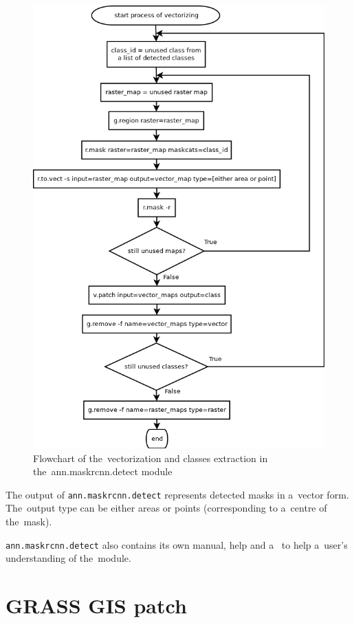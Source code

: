 \begin{figure}[H]
   \centering
	\includegraphics[width=0.95\linewidth]{./pictures/vectorize.png}
	\caption[vectorization in ann.maskrcnn.detect flowchart]{Flowchart of the~vectorization and classes extraction in the~ann.maskrcnn.detect module}
      \label{fig:vectorize}
\end{figure}

The output of \verb|ann.maskrcnn.detect| represents detected masks in a~vector form. The~output type can be either areas or points (corresponding to a~centre of the~mask).

\verb|ann.maskrcnn.detect| also contains its own manual, help and a~ to 
help a~user's understanding of the~module.

\section{GRASS GIS patch}
\label{grass-patch}

